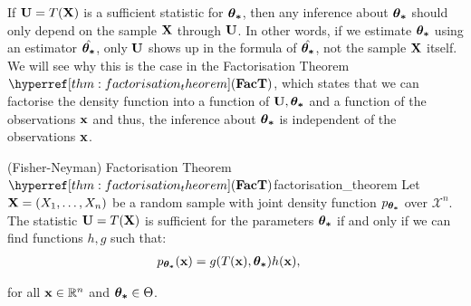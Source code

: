 \begin{definition}
    If ${\bf U}=T({\bf X})$ is a sufficient statistic for $\boldsymbol{\theta_*}$, then any inference about $\boldsymbol{\theta_*}$ should only depend on the sample ${\bf X}$ through ${\bf U}$. \color{blue}In other words, if we estimate $\boldsymbol{\theta_*}$ using an estimator $\hat{\boldsymbol{\theta_*}}$, only ${\bf U}$ shows up in the formula of $\hat{\boldsymbol{\theta_*}}$, not the sample ${\bf X}$ itself. We will see why this is the case in the Factorisation Theorem $\FacT$, which states that we can factorise the density function into a function of ${\bf U}, \boldsymbol{\theta_*}$ and a function of the observations ${\bf x}$ and thus, the inference about $\boldsymbol{\theta_*}$ is independent of the observations ${\bf x}$\color{black}.
\end{definition}

\begin{theorem}{(Fisher-Neyman) Factorisation Theorem $\FacT$}{factorisation_theorem}
    Let ${\bf X} = (X_1, \dots, X_n)$ be a random sample with joint density function $p_{\boldsymbol{\theta_*}}$ over $\mathcal{X}^n$. The statistic ${\bf U}=T({\bf X})$ is sufficient for the parameters $\boldsymbol{\theta_*}$ if and only if we can find functions $h, g$ such that:
    \begin{align*}
        p_{\boldsymbol{\theta_*}}({\bf x}) &= g(T({\bf x}), \boldsymbol{\theta_*})h({\bf x}),
    \end{align*}

    \noindent for all ${\bf x}\in\mathbb{R}^n$ and $\boldsymbol{\theta_*}\in\Theta$.
\end{theorem}

